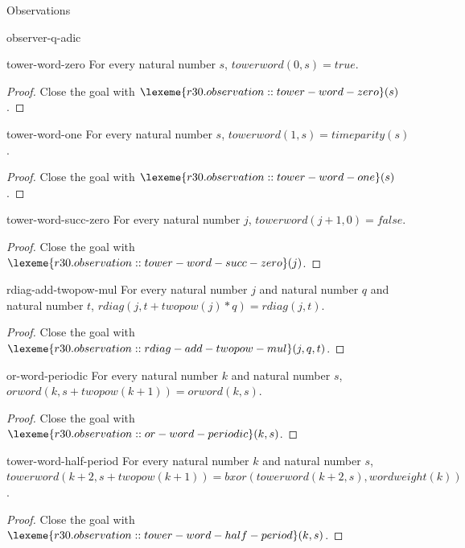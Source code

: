 \begin{lexlean}{Observations}
\begin{section}{observer-q-adic}
\begin{theorem}{tower-word-zero}
For every natural number \(s\), \(towerword(0, s) = true\).
\begin{proof}
Close the goal with \(\lexeme{r30.observation::tower-word-zero}(s)\).
\end{proof}
\end{theorem}

\begin{theorem}{tower-word-one}
For every natural number \(s\), \(towerword(1, s) = timeparity(s)\).
\begin{proof}
Close the goal with \(\lexeme{r30.observation::tower-word-one}(s)\).
\end{proof}
\end{theorem}

\begin{theorem}{tower-word-succ-zero}
For every natural number \(j\), \(towerword(j + 1, 0) = false\).
\begin{proof}
Close the goal with \(\lexeme{r30.observation::tower-word-succ-zero}(j)\).
\end{proof}
\end{theorem}

\begin{theorem}{rdiag-add-twopow-mul}
For every natural number \(j\) and natural number \(q\) and natural number \(t\), \(rdiag(j, t + twopow(j) * q) = rdiag(j, t)\).
\begin{proof}
Close the goal with \(\lexeme{r30.observation::rdiag-add-twopow-mul}(j, q, t)\).
\end{proof}
\end{theorem}

\begin{theorem}{or-word-periodic}
For every natural number \(k\) and natural number \(s\), \(orword(k, s + twopow(k + 1)) = orword(k, s)\).
\begin{proof}
Close the goal with \(\lexeme{r30.observation::or-word-periodic}(k, s)\).
\end{proof}
\end{theorem}

\begin{theorem}{tower-word-half-period}
For every natural number \(k\) and natural number \(s\), \(towerword(k + 2, s + twopow(k + 1)) = bxor(towerword(k + 2, s), wordweight(k))\).
\begin{proof}
Close the goal with \(\lexeme{r30.observation::tower-word-half-period}(k, s)\).
\end{proof}
\end{theorem}


\end{section}
\end{lexlean}
